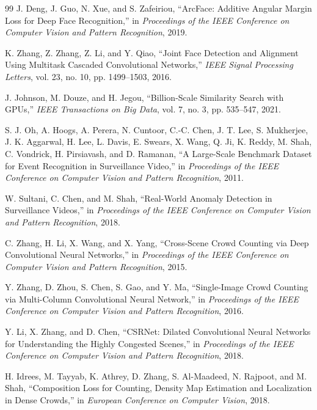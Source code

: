 \documentclass[11pt]{article}
\begin{document}
\begin{thebibliography}{99}
J. Deng, J. Guo, N. Xue, and S. Zafeiriou,
``ArcFace: Additive Angular Margin Loss for Deep Face Recognition,''
in \textit{Proceedings of the IEEE Conference on Computer Vision and Pattern Recognition}, 2019.

K. Zhang, Z. Zhang, Z. Li, and Y. Qiao,
``Joint Face Detection and Alignment Using Multitask Cascaded Convolutional Networks,''
\textit{IEEE Signal Processing Letters}, vol. 23, no. 10, pp. 1499--1503, 2016.

J. Johnson, M. Douze, and H. Jegou,
``Billion-Scale Similarity Search with GPUs,''
\textit{IEEE Transactions on Big Data}, vol. 7, no. 3, pp. 535--547, 2021.

S. J. Oh, A. Hoogs, A. Perera, N. Cuntoor, C.-C. Chen, J. T. Lee, S. Mukherjee, J. K. Aggarwal, H. Lee, L. Davis, E. Swears, X. Wang, Q. Ji, K. Reddy, M. Shah, C. Vondrick, H. Pirsiavash, and D. Ramanan,
``A Large-Scale Benchmark Dataset for Event Recognition in Surveillance Video,''
in \textit{Proceedings of the IEEE Conference on Computer Vision and Pattern Recognition}, 2011.

W. Sultani, C. Chen, and M. Shah,
``Real-World Anomaly Detection in Surveillance Videos,''
in \textit{Proceedings of the IEEE Conference on Computer Vision and Pattern Recognition}, 2018.

C. Zhang, H. Li, X. Wang, and X. Yang,
``Cross-Scene Crowd Counting via Deep Convolutional Neural Networks,''
in \textit{Proceedings of the IEEE Conference on Computer Vision and Pattern Recognition}, 2015.

Y. Zhang, D. Zhou, S. Chen, S. Gao, and Y. Ma,
``Single-Image Crowd Counting via Multi-Column Convolutional Neural Network,''
in \textit{Proceedings of the IEEE Conference on Computer Vision and Pattern Recognition}, 2016.

Y. Li, X. Zhang, and D. Chen,
``CSRNet: Dilated Convolutional Neural Networks for Understanding the Highly Congested Scenes,''
in \textit{Proceedings of the IEEE Conference on Computer Vision and Pattern Recognition}, 2018.

H. Idrees, M. Tayyab, K. Athrey, D. Zhang, S. Al-Maadeed, N. Rajpoot, and M. Shah,
``Composition Loss for Counting, Density Map Estimation and Localization in Dense Crowds,''
in \textit{European Conference on Computer Vision}, 2018.

\end{thebibliography}
\end{document}
